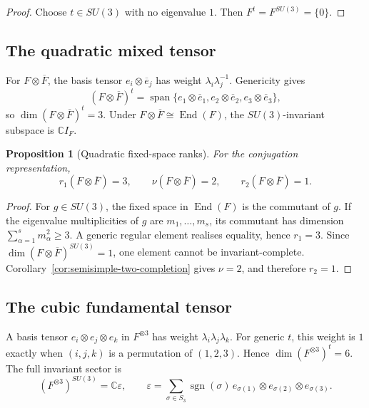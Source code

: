\documentclass[11pt]{article}
\theoremstyle{plain}
\newtheorem{proposition}[theorem]{Proposition}
\theoremstyle{definition}
\begin{document}
\begin{proof}
Choose \(t\in SU(3)\) with no eigenvalue \(1\). Then \(F^t=F^{SU(3)}=\{0\}\).
\end{proof}

\subsection{The quadratic mixed tensor}

For \(F\otimes\overline F\), the basis tensor \(e_i\otimes\overline e_j\) has weight \(\lambda_i\lambda_j^{-1}\). Genericity gives
\[
(F\otimes\overline F)^t
=
\operatorname{span}
\{e_1\otimes\overline e_1,
e_2\otimes\overline e_2,
e_3\otimes\overline e_3\},
\]
so
\(\dim(F\otimes\overline F)^t=3\).
Under
\(F\otimes\overline F\cong\operatorname{End}(F)\),
the \(SU(3)\)-invariant subspace is \(\mathbb C I_F\).

\begin{proposition}[Quadratic fixed-space ranks]
\label{prop:SU3-quadratic-nu}
For the conjugation representation,
\[
r_1(F\otimes\overline F)=3,
\qquad
\nu(F\otimes\overline F)=2,
\qquad
r_2(F\otimes\overline F)=1.
\]
\end{proposition}

\begin{proof}
For \(g\in SU(3)\), the fixed space in \(\operatorname{End}(F)\) is the commutant of \(g\). If the eigenvalue multiplicities of \(g\) are \(m_1,\ldots,m_s\), its commutant has dimension
\(\sum_{\alpha=1}^{s}m_\alpha^2\geq3\).
A generic regular element realises equality, hence \(r_1=3\). Since
\(\dim(F\otimes\overline F)^{SU(3)}=1\),
one element cannot be invariant-complete. Corollary~\ref{cor:semisimple-two-completion} gives \(\nu=2\), and therefore \(r_2=1\).
\end{proof}

\subsection{The cubic fundamental tensor}

A basis tensor \(e_i\otimes e_j\otimes e_k\) in \(F^{\otimes3}\) has weight
\(\lambda_i\lambda_j\lambda_k\).
For generic \(t\), this weight is \(1\) exactly when \((i,j,k)\) is a permutation of \((1,2,3)\). Hence
\(\dim(F^{\otimes3})^t=6\).
The full invariant sector is
\[
(F^{\otimes3})^{SU(3)}
=
\mathbb C\varepsilon,
\qquad
\varepsilon
=
\sum_{\sigma\in S_3}
\operatorname{sgn}(\sigma)\,
e_{\sigma(1)}\otimes e_{\sigma(2)}\otimes e_{\sigma(3)}.
\]
\end{document}
